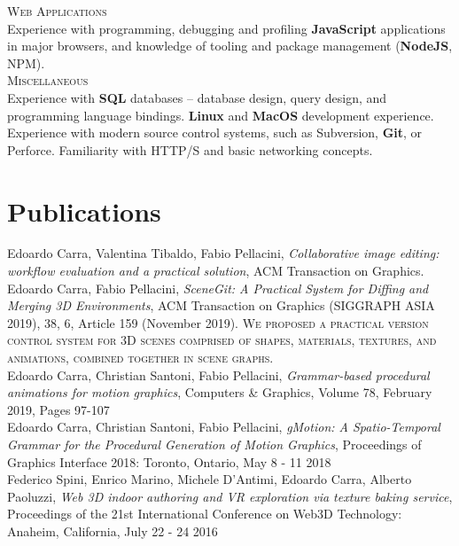 \documentclass[10pt, a4paper]{article} %
\newcommand{\years}[1]{\marginnote{\scriptsize #1}} %
\begin{document}
\textsc{Web Applications}\\
Experience with programming, debugging and profiling \textbf{JavaScript} applications in major browsers, and knowledge of tooling and package management (\textbf{NodeJS}, NPM).\\

\textsc{Miscellaneous}\\
Experience with \textbf{SQL} databases -- database design, query design, and programming language bindings. \textbf{Linux} and \textbf{MacOS} development experience. Experience with modern source control systems, such as Subversion, \textbf{Git}, or Perforce. Familiarity with HTTP/S and basic networking concepts.



\section*{Publications}

\years{in submission} Edoardo Carra, Valentina Tibaldo, Fabio Pellacini, \emph{Collaborative image editing: workflow evaluation and a practical solution}, ACM Transaction on Graphics.\\

\years{2019} Edoardo Carra, Fabio Pellacini, \emph{SceneGit: A Practical System for Diffing and Merging 3D Environments}, ACM Transaction on Graphics (SIGGRAPH ASIA 2019), 38, 6, Article 159 (November 2019). \textsc{We proposed a practical version control system for 3D scenes comprised of shapes, materials, textures, and animations, combined together in scene graphs.}\\

\years{2019} Edoardo Carra, Christian Santoni, Fabio Pellacini, \emph{Grammar-based procedural animations for motion graphics}, Computers \& Graphics, Volume 78, February 2019, Pages 97-107\\
\years{2018} Edoardo Carra, Christian Santoni, Fabio Pellacini, \emph{gMotion: A Spatio-Temporal Grammar for the Procedural Generation of Motion Graphics}, Proceedings of Graphics Interface 2018: Toronto, Ontario, May 8 - 11 2018\\
\years{2016} Federico Spini, Enrico Marino, Michele D'Antimi, Edoardo Carra, Alberto Paoluzzi, \emph{Web 3D indoor authoring and VR exploration via texture baking service}, Proceedings of the 21st International Conference on Web3D Technology: Anaheim, California, July 22 - 24 2016
\end{document}
